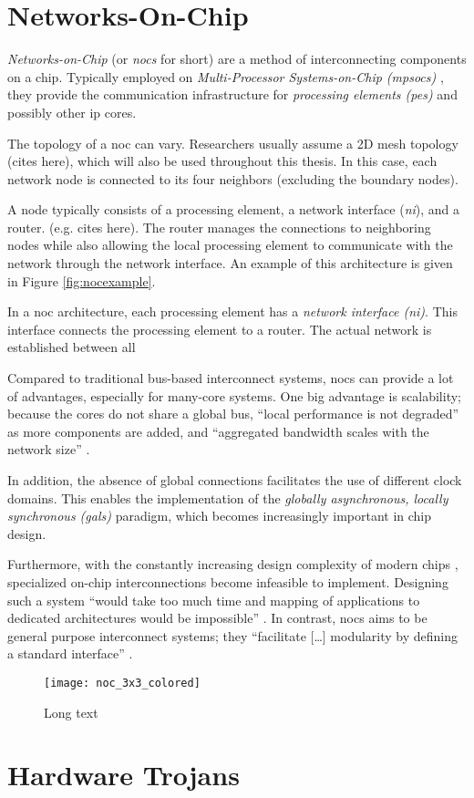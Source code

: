 \section{Networks-On-Chip}\label{sec:networkonchip}
\textit{Networks-on-Chip} (or \textit{\glspl{noc}} for short) are a method of interconnecting components on a chip. Typically employed on
\textit{Multi-Processor Systems-on-Chip (\glspl{mpsoc})} \cites(e.g.)(){ivanov05nocintroduction}{biswas15routerattack}{tatas16designingnocs}, they
provide the communication infrastructure for \textit{processing elements (\glspl{pe})} and possibly other \gls{ip} cores.

The topology of a \gls{noc} can vary. Researchers usually assume a 2D mesh topology (cites here), which will also be used throughout this thesis.
In this case, each network node is connected to its four neighbors (excluding the boundary nodes).

A node typically consists of a processing element, a network interface (\textit{\gls{ni}}), and a router. (e.g. cites here). The router manages the connections to
neighboring nodes while also allowing the local processing element to communicate with the network through the network interface. An example of this
architecture is given in Figure \vref{fig:nocexample}.

In a \gls{noc} architecture, each processing element has a \textit{network interface (\gls{ni})}. This interface connects the processing element to a
router. The actual network is established between all

Compared to traditional bus-based interconnect systems, \glspl{noc} can provide a lot of advantages, especially for many-core systems.
\cite[5\psqq]{tatas16designingnocs} One big advantage is scalability; because the cores do not share a global bus, \enquote{local performance is not
degraded} \cite[6]{tatas16designingnocs} as more components are added, and \enquote{aggregated bandwidth scales with the network size}
\cite[6]{tatas16designingnocs}.

In addition, the absence of global connections facilitates the use of different clock domains. This enables the implementation of the
\textit{globally asynchronous, locally synchronous (\gls{gals})} paradigm, which becomes increasingly important in chip design.
\cites[3]{kumar02networkonchip}[2]{ivanov05nocintroduction}

Furthermore, with the constantly increasing design complexity of modern chips \cite{mack11mooreslaw}, specialized on-chip
interconnections become infeasible to implement. Designing such a system \enquote{would take too much time and mapping of applications to dedicated
architectures would be impossible} \cite[1]{kumar02networkonchip}. In contrast, \glspl{noc} aims to be general purpose interconnect systems; they
\enquote{facilitate […] modularity by defining a standard interface} \cite[1]{dally01routepacketsnotwires}.

\begin{figure}
    \centering
    \texttt{[image: noc\_3x3\_colored]}
    \caption[Short text]{Long text} %
    \label{fig:nocexample}
\end{figure}

\section{Hardware Trojans}\label{sec:hardwaretrojans}

